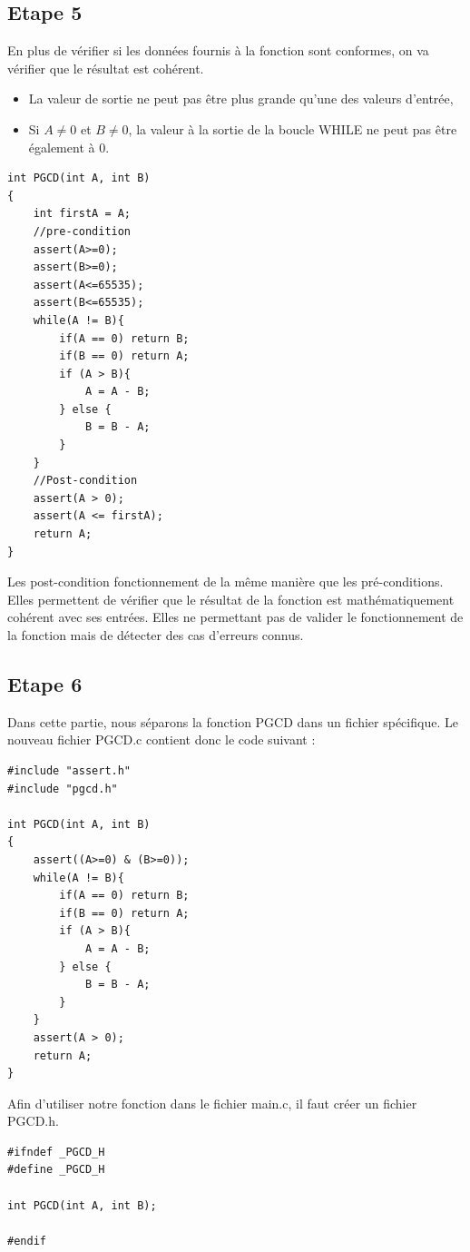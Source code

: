 \documentclass[a4paper]{article}
\begin{document}
    \subsection{Etape 5}
        En plus de vérifier si les données fournis à la fonction sont conformes, on va vérifier que le résultat est cohérent.
        \begin{itemize}
            \item La valeur de sortie ne peut pas être plus grande qu'une des valeurs d'entrée,
            \item Si $A \neq 0$ et $B \neq 0$, la valeur à la sortie de la boucle WHILE ne peut pas être également à 0.
        \end{itemize}
\begin{lstlisting}[style=CStyle]
int PGCD(int A, int B)
{
	int firstA = A;
    //pre-condition
	assert(A>=0);
	assert(B>=0);
	assert(A<=65535);
	assert(B<=65535);
	while(A != B){
		if(A == 0) return B;
		if(B == 0) return A;
		if (A > B){
			A = A - B;
		} else {
			B = B - A;
		}
	}
    //Post-condition
	assert(A > 0);
	assert(A <= firstA);
	return A;
}
\end{lstlisting}

        Les post-condition fonctionnement de la même manière que les pré-conditions.
        Elles permettent de vérifier que le résultat de la fonction est mathématiquement cohérent avec ses entrées.
        Elles ne permettant pas de valider le fonctionnement de la fonction mais de détecter des cas d'erreurs connus.
    \subsection{Etape 6}
       Dans cette partie, nous séparons la fonction PGCD dans un fichier spécifique.
       Le nouveau fichier PGCD.c contient donc le code suivant :
\begin{lstlisting}[style=CStyle]
#include "assert.h"
#include "pgcd.h"

int PGCD(int A, int B)
{
    assert((A>=0) & (B>=0));
    while(A != B){
        if(A == 0) return B;
        if(B == 0) return A;
        if (A > B){
            A = A - B;
        } else {
            B = B - A;
        }
    }
    assert(A > 0);
    return A;
}    
\end{lstlisting}

        Afin d'utiliser notre fonction dans le fichier main.c, il faut créer un fichier PGCD.h.
\begin{lstlisting}[style=CStyle]
#ifndef _PGCD_H
#define _PGCD_H 

int PGCD(int A, int B);

#endif   
\end{lstlisting}
\end{document}
